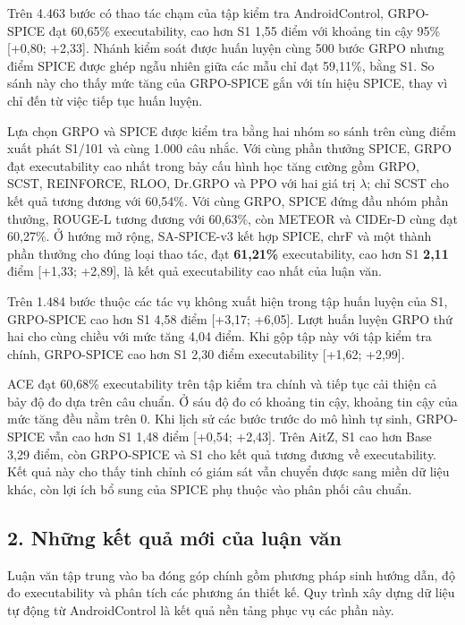 Trên 4.463 bước có thao tác chạm của tập kiểm tra AndroidControl, GRPO-SPICE đạt 60,65\% executability, cao hơn S1 1,55 điểm với khoảng tin cậy 95\% [+0,80; +2,33]. Nhánh kiểm soát được huấn luyện cùng 500 bước GRPO nhưng điểm SPICE được ghép ngẫu nhiên giữa các mẫu chỉ đạt 59,11\%, bằng S1. So sánh này cho thấy mức tăng của GRPO-SPICE gắn với tín hiệu SPICE, thay vì chỉ đến từ việc tiếp tục huấn luyện.

Lựa chọn GRPO và SPICE được kiểm tra bằng hai nhóm so sánh trên cùng điểm xuất phát S1/101 và cùng 1.000 câu nhắc. Với cùng phần thưởng SPICE, GRPO đạt executability cao nhất trong bảy cấu hình học tăng cường gồm GRPO, SCST, REINFORCE, RLOO, Dr.GRPO và PPO với hai giá trị $\lambda$; chỉ SCST cho kết quả tương đương với 60,54\%. Với cùng GRPO, SPICE đứng đầu nhóm phần thưởng, ROUGE-L tương đương với 60,63\%, còn METEOR và CIDEr-D cùng đạt 60,27\%. Ở hướng mở rộng, SA-SPICE-v3 kết hợp SPICE, chrF và một thành phần thưởng cho đúng loại thao tác, đạt \textbf{61,21\%} executability, cao hơn S1 \textbf{2,11} điểm [+1,33; +2,89], là kết quả executability cao nhất của luận văn.

Trên 1.484 bước thuộc các tác vụ không xuất hiện trong tập huấn luyện của S1, GRPO-SPICE cao hơn S1 4,58 điểm [+3,17; +6,05]. Lượt huấn luyện GRPO thứ hai cho cùng chiều với mức tăng 4,04 điểm. Khi gộp tập này với tập kiểm tra chính, GRPO-SPICE cao hơn S1 2,30 điểm executability [+1,62; +2,99].

ACE đạt 60,68\% executability trên tập kiểm tra chính và tiếp tục cải thiện cả bảy độ đo dựa trên câu chuẩn. Ở sáu độ đo có khoảng tin cậy, khoảng tin cậy của mức tăng đều nằm trên 0. Khi lịch sử các bước trước do mô hình tự sinh, GRPO-SPICE vẫn cao hơn S1 1,48 điểm [+0,54; +2,43]. Trên AitZ, S1 cao hơn Base 3,29 điểm, còn GRPO-SPICE và S1 cho kết quả tương đương về executability. Kết quả này cho thấy tinh chỉnh có giám sát vẫn chuyển được sang miền dữ liệu khác, còn lợi ích bổ sung của SPICE phụ thuộc vào phân phối câu chuẩn.

\subsection*{2. Những kết quả mới của luận văn}

Luận văn tập trung vào ba đóng góp chính gồm phương pháp sinh hướng dẫn, độ đo executability và phân tích các phương án thiết kế. Quy trình xây dựng dữ liệu tự động từ AndroidControl là kết quả nền tảng phục vụ các phần này.

